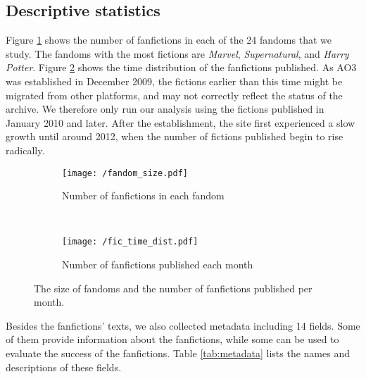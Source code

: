 \documentclass[a4paper]{article}
\begin{document}
\subsection*{Descriptive statistics}

Figure \ref{fig:fandom_size} shows the number of fanfictions in each of the 24 fandoms that we study. The fandoms with the most fictions are \emph{Marvel}, \emph{Supernatural}, and \emph{Harry Potter}. Figure \ref{fig:fic_time_dist}  shows the time distribution of the fanfictions published. As AO3 was established in December 2009, the fictions earlier than this time might be migrated from other platforms, and may not correctly reflect the status of the archive. We therefore only run our analysis using the fictions published in January 2010 and later. After the establishment, the site first experienced a slow growth until around 2012, when the number of fictions published begin to rise radically. 

\begin{figure}
    \centering
    \begin{subfigure}[b]{\textwidth}
        \texttt{[image: /fandom\_size.pdf]}
        \caption{Number of fanfictions in each fandom}
        \label{fig:fandom_size}
    \end{subfigure}
    ~ %
    \begin{subfigure}[b]{0.8\textwidth}
        \texttt{[image: /fic\_time\_dist.pdf]}
        \caption{Number of fanfictions published each month}
        \label{fig:fic_time_dist}
    \end{subfigure}
    \caption{The size of fandoms and the number of fanfictions published per month.}\label{fig:stats_size_time}
\end{figure}

Besides the fanfictions' texts, we also collected metadata including 14 fields. Some of them provide information about the fanfictions, while some can be used to evaluate the success of the fanfictions. Table \ref{tab:metadata} lists the names and descriptions of these fields. 
\end{document}
